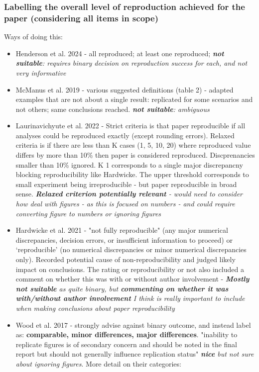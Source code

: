 \subsubsection{Labelling the overall level of reproduction achieved for the paper (considering all items in scope)}

Ways of doing this:
\begin{itemize}
    \item Henderson et al. 2024 - all reproduced; at least one reproduced;\autocite{henderson_reproducibility_2024} \textit{\textbf{not suitable}: requires binary decision on reproduction success for each, and not very informative}
    \item McManus et al. 2019 - various suggested definitions (table 2) - adapted examples that are not about a single result:  replicated for some scenarios and not others; same conclusions reached.\autocite{mcmanus_can_2019} \textit{\textbf{not suitable}: ambiguous}
    \item Laurinavichyute et al. 2022 - Strict criteria is that paper reproducible if all analyses could be reproduced exactly (except rounding errors). Relaxed criteria is if there are less than K cases (1, 5, 10, 20) where reproduced value differs by more than 10\% then paper is considered reproduced. Discprenancies smaller than 10\% ignored. K 1 corresponds to a single major discrepancny blocking reproducibility like Hardwicke. The upper threshold corresponds to small experiment being irreproducible - but paper reproducible in broad sense. \autocite{laurinavichyute_share_2022} \textit{\textbf{Relaxed criterion potentially relevant} - would need to consider how deal with figures - as this is focused on numbers - and could require converting figure to numbers or ignoring figures}
    \item Hardwicke et al. 2021 - "not fully reproducible"  (any major numerical discrepancies, decision errors, or insufficient information to proceed) or ‘reproducible’ (no numerical discrepancies or minor numerical discrepancies only). Recorded potential cause of non-reproducibility and judged likely impact on conclusions. The rating or reproducibility or not also included a comment on whether this was with or without author involvement\autocite{hardwicke_analytic_2021, hardwicke_pre-registered_2017} - \textit{\textbf{Mostly not suitable} as quite binary, but \textbf{commenting on whether it was with/without author involvement} I think is really important to include when making conclusions about paper reproducibility}
    \item Wood et al. 2017 - strongly advise against binary outcome, and instead label as: \textbf{comparable, minor differences, major differences}. "inability to replicate figures is of secondary concern and should be noted in the final report but should not generally influence replication status" \autocite{wood_push_2018, wood_replication_2018} \textit{\textbf{nice} but not sure about ignoring figures}. More detail on their categories:

\end{itemize}
